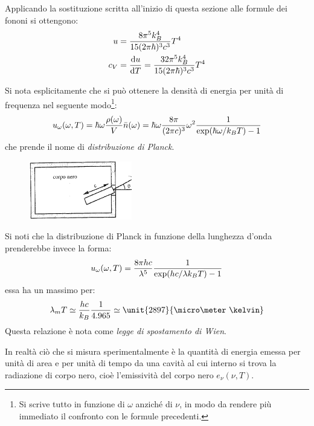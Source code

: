 Applicando la sostituzione scritta all'inizio di questa sezione alle formule dei fononi si ottengono:
\begin{align*}
u &= \frac{8 \pi^5 k_B^4}{15 \hplanck^3 c^3} T^4\\
c_V &= \derivative{u}{T} = \frac{32 \pi^5 k_B^4}{15 \hplanck^3 c^3} T^4
\end{align*}

Si nota esplicitamente che si può ottenere la densità di energia per unità di frequenza nel seguente modo\footnote{Si scrive tutto in funzione di $ \omega $ anziché di $ \nu $, in modo da rendere più immediato il confronto con le formule precedenti.}:
\begin{equation*}
u_\omega (\omega, T) = \hbar \omega  \frac{\rho(\omega)}{V} \bar{n}(\omega) = \hbar \omega  \frac{8\pi}{(2\pi c)^3}\omega^2 \frac{1}{\exp(\hbar\omega/k_B T) - 1}
\end{equation*}
che prende il nome di \textit{distribuzione di Planck}.

\begin{figure}
	\vspace{-10pt}
	\centering
	\includegraphics[width=0.4\textwidth]{Immagini/CorpoNero.png}
	\caption{}
	\label{fig:corponero}
	\vspace{-10pt}
\end{figure}

Si noti che la distribuzione di Planck in funzione della lunghezza d'onda prenderebbe invece la forma:
\begin{equation*}
u_\omega (\omega, T) = \frac{8\pi h c}{\lambda^5} \frac{1}{\exp(hc/\lambda k_B T) - 1}
\end{equation*}
essa ha un massimo per:
\begin{equation*}
\lambda_m T \simeq \frac{h c}{k_B} \frac{1}{4.965} \simeq \unit{2897}{\micro\meter  ~\kelvin}
\end{equation*}
Questa relazione è nota come \textit{legge di spostamento di Wien}.
\newline

In realtà ciò che si misura sperimentalmente è la quantità di energia emessa per unità di area e per unità di tempo da una cavità al cui interno si trova la radiazione di corpo nero, cioè l'emissività del corpo nero $ e_\nu (\nu,T) $.

